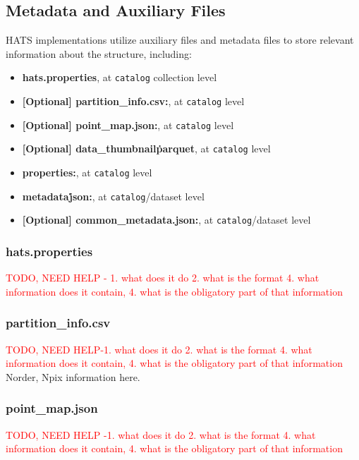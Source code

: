 \documentclass[11pt,a4paper]{ivoa}
\begin{document}
    \subsection{Metadata and Auxiliary Files} \label{sec:meta}
    HATS implementations utilize auxiliary files and metadata files to store relevant information about the  structure, including:
    \begin{itemize}
    	\item \textbf{hats.properties}, at  \texttt{catalog} collection level
         \item \textbf{[Optional] partition\_info.csv:}, at  \texttt{catalog} level
        \item \textbf{[Optional] point\_map.json:}, at  \texttt{catalog} level
        \item \textbf{[Optional] data\_thumbnail\.parquet}, at  \texttt{catalog} level
        \item \textbf{properties:}, at  \texttt{catalog} level
        \item \textbf{metadata\.json:}, at  \texttt{catalog}/dataset level
        \item \textbf{[Optional] common\_metadata.json:}, at  \texttt{catalog}/dataset level
    \end{itemize}
    
    \subsubsection{hats.properties} 
    \textcolor{red}{TODO, NEED HELP - 1. what does it do 2. what is the format 4. what information does it contain, 4. what is the obligatory part of that information} 
    
        \subsubsection{partition\_info.csv} 
   \textcolor{red}{TODO, NEED HELP-1. what does it do 2. what is the format 4. what information does it contain, 4. what is the obligatory part of that information}
	Norder, Npix  information here. 
    
        \subsubsection{point\_map.json} 
   \textcolor{red}{TODO, NEED HELP -1. what does it do 2. what is the format 4. what information does it contain, 4. what is the obligatory part of that information}
   
\end{document}
